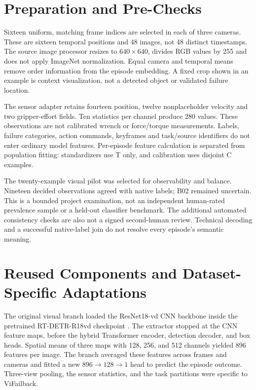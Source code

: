 \section{Preparation and Pre-Checks}
Sixteen uniform, matching frame indices are selected in each of three cameras. These are
sixteen temporal positions and 48 images, not 48 distinct timestamps. The source image
processor resizes to $640\times640$, divides RGB values by 255 and does not apply
ImageNet normalization. Equal camera and temporal means remove order information from
the episode embedding. A fixed crop shown in an example is context visualization, not a
detected object or validated failure location.

The sensor adapter retains fourteen position, twelve nonplaceholder velocity and two
gripper-effort fields. Ten statistics per channel produce 280 values. These observations
are not calibrated wrench or force/torque measurements. Labels, failure categories,
action commands, keyframes and task/source identifiers do not enter ordinary model
features. Per-episode feature calculation is separated from population fitting:
standardizers use T only, and calibration uses disjoint C examples.

The twenty-example visual pilot was selected for observability and balance. Nineteen
decided observations agreed with native labels; B02 remained uncertain. This is a
bounded project examination, not an independent human-rated prevalence sample or a
held-out classifier benchmark. The additional automated consistency checks are also not
a signed second-human review. Technical decoding and a successful native-label join do
not resolve every episode's semantic meaning.

\section{Reused Components and Dataset-Specific Adaptations}
The original visual branch loaded the ResNet18-vd CNN backbone inside the pretrained
RT-DETR-R18vd checkpoint \citep{Zhao2024RTDETR}. The extractor stopped at the CNN
feature maps, before the hybrid Transformer encoder, detection decoder, and box heads.
Spatial means of three maps with 128, 256, and 512 channels yielded 896 features per
image. The branch averaged these features across frames and cameras and fitted a new
$896\rightarrow128\rightarrow1$ head to predict the episode outcome. Three-view pooling,
the sensor statistics, and the task partitions were specific to ViFailback.

